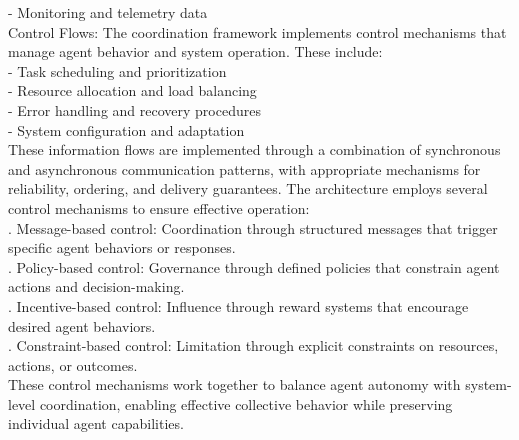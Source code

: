 - Monitoring and telemetry data\\ \newline
Control Flows: The coordination framework implements control mechanisms that manage agent behavior and system operation. These include:\\ \newline
- Task scheduling and prioritization\\ \newline
- Resource allocation and load balancing\\ \newline
- Error handling and recovery procedures\\ \newline
- System configuration and adaptation\\ \newline
These information flows are implemented through a combination of synchronous and asynchronous communication patterns, with appropriate mechanisms for reliability, ordering, and delivery guarantees. The architecture employs several control mechanisms to ensure effective operation:\\ . Message-based control: Coordination through structured messages that trigger specific agent behaviors or responses.\\ . Policy-based control: Governance through defined policies that constrain agent actions and decision-making.\\ . Incentive-based control: Influence through reward systems that encourage desired agent behaviors.\\ . Constraint-based control: Limitation through explicit constraints on resources, actions, or outcomes.\\ \newline
These control mechanisms work together to balance agent autonomy with system-level coordination, enabling effective collective behavior while preserving individual agent capabilities.\\
